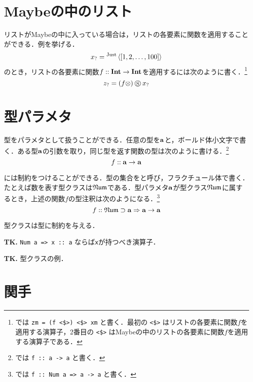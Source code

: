 \documentclass[platex,a5paper,twoside,fleqn,draft]{jsbook}
\newcommand{\keyword}[1]{\textgt{\textbf{#1}}}
\newcommand{\tobewritten}[1]{\begin{screen}\textbf{TK.} {#1}\end{screen}}
\begin{document}
\section{Maybeの中のリスト}

リストがMaybeの中に入っている場合は，リストの各要素に関数を適用することができる．例を挙げる．
\begin{equation}
{x}_?={}^{\text{Just}}\left\langle[1,2,\dots,100]\right\rangle
\end{equation}
のとき，リストの各要素に関数$f::\mathord{\mathbf{Int}}\rightarrow\mathord{\mathbf{Int}}$を適用するには次のように書く．\footnote{\haskell では \verb|zm = (f <$>) <$> xm| と書く．最初の \verb|<$>| はリストの各要素に関数$f$を適用する演算子，2番目の \verb|<$>| はMaybeの中のリストの各要素に関数$f$を適用する演算子である．}
\begin{equation}
{z}_?=(f\otimes)\mathbin{\circledS}{x}_?
\end{equation}

\section{型パラメタ}

型をパラメタとして扱うことができる．任意の型を$\mathord{\mathbf{a}}$と，ボールド体小文字で書く．ある型$\mathord{\mathbf{a}}$の引数を取り，同じ型を返す関数の型は次のように書ける．\footnote{\haskell では \verb|f :: a -> a| と書く．}
\begin{equation}
f::\mathord{\mathbf{a}}\rightarrow\mathord{\mathbf{a}}
\end{equation}

\keyword{型パラメタ}には制約をつけることができる．型の集合を\keyword{型クラス}と呼び，フラクチュール体で書く．たとえば数を表す型クラスは$\mathfrak{Num}$である．型パラメタ$\mathord{\mathbf{a}}$が型クラス$\mathfrak{Num}$に属するとき，上述の関数$f$の型注釈は次のようになる．\footnote{\haskell では \verb|f :: Num a => a -> a| と書く．}
\begin{equation}
f::
  \mathfrak{Num}\supset\mathord{\mathbf{a}}\Rightarrow\mathord{\mathbf{a}}\rightarrow\mathord{\mathbf{a}}
\end{equation}

型クラスは型に制約を与える．

\tobewritten{\texttt{Num a => x :: a} ならば\texttt{x}が持つべき演算子．}

\tobewritten{型クラスの例．}

\section{関手}
\end{document}
